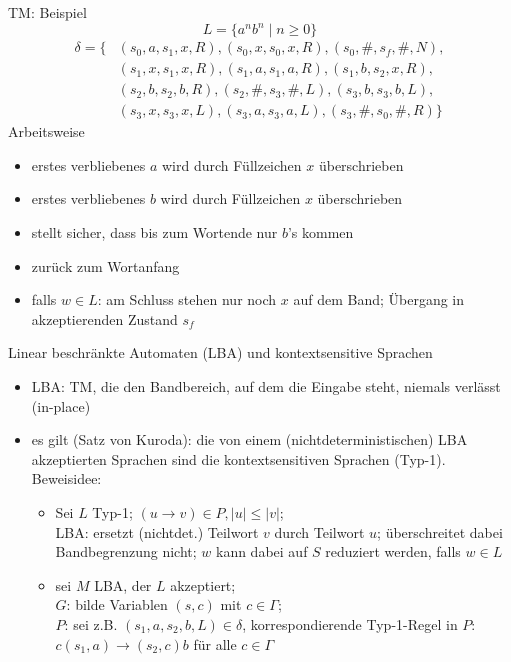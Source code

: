 \begin{frame}{TM: Beispiel}
	$$L=\{a^nb^n \mid n\geq 0\}$$
	\begin{align*}
		\delta = \{&(s_0, a, s_1, x, R), (s_0, x, s_0, x, R), (s_0, \#, s_f, \#, N),\\
		&(s_1, x, s_1, x, R), (s_1, a, s_1, a, R), (s_1, b, s_2, x, R),\\
		&(s_2, b, s_2, b, R), (s_2, \#, s_3, \#, L), (s_3, b, s_3, b, L),\\
		&(s_3, x, s_3, x, L), (s_3, a, s_3, a, L), (s_3, \#, s_0, \#, R)\}
	\end{align*}
	\scriptsize
	Arbeitsweise
	\begin{itemize}
		\item [$s_0$:] erstes verbliebenes $a$ wird durch Füllzeichen $x$ überschrieben
		\item [$s_1$:] erstes verbliebenes $b$ wird durch Füllzeichen $x$ überschrieben
		\item [$s_2$:] stellt sicher, dass bis zum Wortende nur $b$'s kommen
		\item [$s_3$:] zurück zum Wortanfang
		\item falls $w\in L$: am Schluss stehen nur noch $x$ auf dem Band; Übergang in akzeptierenden Zustand $s_f$
	\end{itemize}
\end{frame}

\begin{frame}{Linear beschränkte Automaten (LBA) und kontextsensitive Sprachen}
	\begin{itemize}
		\item LBA: TM, die den Bandbereich, auf dem die Eingabe steht, niemals verlässt (in-place)
		\item es gilt (Satz von Kuroda): die von einem (nichtdeterministischen) LBA akzeptierten Sprachen sind die kontextsensitiven Sprachen (Typ-1).\\
		Beweisidee:
		\begin{itemize}
			\item Sei $L$ Typ-1; $(u \rightarrow v) \in P, |u|\leq |v|$;\\
			LBA: ersetzt (nichtdet.) Teilwort $v$ durch Teilwort $u$; überschreitet dabei Bandbegrenzung nicht; $w$ kann dabei auf $S$ reduziert werden, falls $w \in L$
			\item sei $M$ LBA, der $L$ akzeptiert;\\
			$G$: bilde Variablen $(s, c)$ mit $c \in \Gamma$;\\
			$P$: sei z.B. $(s_1, a, s_2, b, L) \in \delta$, korrespondierende Typ-1-Regel in $P$: $c(s_1, a) \rightarrow (s_2, c)b$ für alle $c \in \Gamma$
		\end{itemize}
	\end{itemize}
\end{frame}

